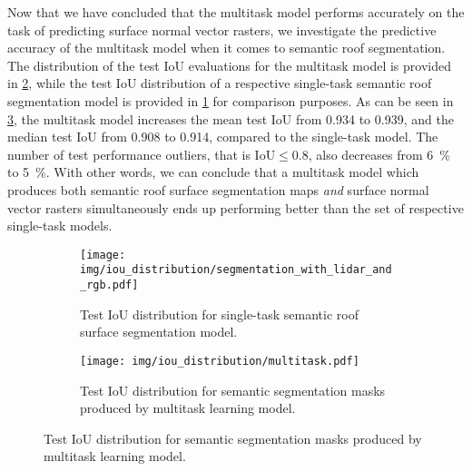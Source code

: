 \newpage
Now that we have concluded that the multitask model performs accurately on the task of predicting surface normal vector rasters, we investigate the predictive accuracy of the multitask model when it comes to semantic roof segmentation.
The distribution of the test IoU evaluations for the multitask model is provided in \cref{fig:multitask-iou-distribution}, while the test IoU distribution of a respective single-task semantic roof segmentation model is provided in \cref{fig:single-task-iou-distribution} for comparison purposes.
As can be seen in \cref{fig:iou-distribution}, the multitask model increases the mean test IoU from \num{0.934} to \num{0.939}, and the median test IoU from \num{0.908} to \num{0.914}, compared to the single-task model.
The number of test performance outliers, that is $\mathrm{IoU} \leq 0.8$, also decreases from \SI{6}{\percent} to \SI{5}{\percent}.
With other words, we can conclude that a multitask model which produces both semantic roof surface segmentation maps \emph{and} surface normal vector rasters simultaneously ends up performing better than the set of respective single-task models.
%
\begin{figure}
  \centering
  \begin{subfigure}{\linewidth}
    \centering
    \texttt{[image: img/iou\_distribution/segmentation\_with\_lidar\_and\_rgb.pdf]}
    \caption{%
      Test IoU distribution for single-task semantic roof surface segmentation model.
    }%
    \label{fig:single-task-iou-distribution}
  \end{subfigure}
  \par\bigskip %
  \begin{subfigure}{\linewidth}
    \centering
    \texttt{[image: img/iou\_distribution/multitask.pdf]}
    \caption{%
      Test IoU distribution for semantic segmentation masks produced by multitask learning model.
    }%
    \label{fig:multitask-iou-distribution}
  \end{subfigure}
  \label{fig:iou-distribution}
\end{figure}

